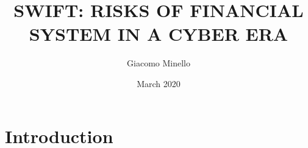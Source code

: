 \documentclass{article}
\title{SWIFT: RISKS OF FINANCIAL SYSTEM IN A CYBER ERA}
\author{Giacomo Minello}
\date{March 2020}
\begin{document}
\maketitle

\section{Introduction}
\end{document}
